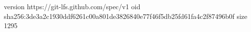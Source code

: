 version https://git-lfs.github.com/spec/v1
oid sha256:3de3a2c1930ddf6261c00a801de3826840e77f46f5db25fd61fa4c2f87496b0f
size 1295
